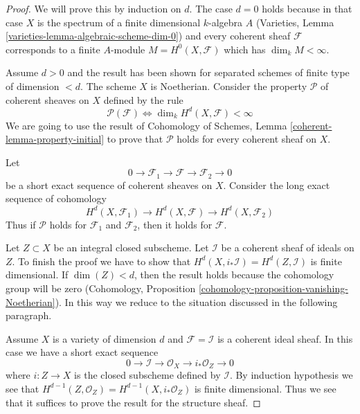 \begin{proof}
We will prove this by induction on $d$. The case $d = 0$ holds because
in that case $X$ is the spectrum of a finite dimensional $k$-algebra $A$
(Varieties, Lemma \ref{varieties-lemma-algebraic-scheme-dim-0})
and every coherent sheaf $\mathcal{F}$ corresponds to a finite $A$-module
$M = H^0(X, \mathcal{F})$ which has $\dim_k M < \infty$.

\medskip\noindent
Assume $d > 0$ and the result has been shown for separated schemes
of finite type of dimension $< d$. The scheme $X$ is Noetherian. Consider
the property $\mathcal{P}$ of coherent sheaves on $X$ defined by the rule
$$
\mathcal{P}(\mathcal{F}) \Leftrightarrow
\dim_k H^d(X, \mathcal{F}) < \infty
$$
We are going to use the result of
Cohomology of Schemes, Lemma \ref{coherent-lemma-property-initial}
to prove that $\mathcal{P}$ holds for every coherent sheaf on $X$.

\medskip\noindent
Let
$$
0 \to \mathcal{F}_1 \to \mathcal{F} \to \mathcal{F}_2 \to 0
$$
be a short exact sequence of coherent sheaves on $X$.
Consider the long exact sequence of cohomology
$$
H^d(X, \mathcal{F}_1) \to
H^d(X, \mathcal{F}) \to
H^d(X, \mathcal{F}_2)
$$
Thus if $\mathcal{P}$ holds for $\mathcal{F}_1$ and $\mathcal{F}_2$,
then it holds for $\mathcal{F}$.

\medskip\noindent
Let $Z \subset X$ be an integral closed subscheme. Let $\mathcal{I}$
be a coherent sheaf of ideals on $Z$. To finish the proof we have to show
that $H^d(X, i_*\mathcal{I}) = H^d(Z, \mathcal{I})$ is finite dimensional.
If $\dim(Z) < d$, then the result holds because the cohomology group
will be zero (Cohomology, Proposition
\ref{cohomology-proposition-vanishing-Noetherian}).
In this way we reduce to the situation discussed in the following paragraph.

\medskip\noindent
Assume $X$ is a variety of dimension $d$ and 
$\mathcal{F} = \mathcal{I}$ is a coherent ideal sheaf. In this
case we have a short exact sequence
$$
0 \to \mathcal{I} \to \mathcal{O}_X \to i_*\mathcal{O}_Z \to 0
$$
where $i : Z \to X$ is the closed subscheme defined by $\mathcal{I}$.
By induction hypothesis we see that
$H^{d - 1}(Z, \mathcal{O}_Z) = H^{d - 1}(X, i_*\mathcal{O}_Z)$ is
finite dimensional. Thus we see that it suffices to prove the result
for the structure sheaf.


\end{proof}
